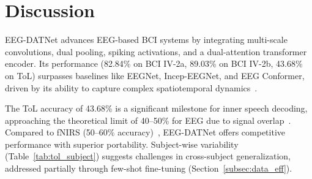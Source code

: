 \documentclass[pdflatex,sn-mathphys-num]{sn-jnl}%
\theoremstyle{thmstyleone}
\theoremstyle{thmstyletwo}
\theoremstyle{thmstylethree}
\begin{document}
\begin{table*}[htbp]
\centering
\caption{Ablation Study on BCI IV-2a}
\label{tab:ablation_test_BCI_IV_2a}
\end{table*}

\section{Discussion}

EEG-DATNet advances EEG-based BCI systems by integrating multi-scale convolutions, dual pooling, spiking activations, and a dual-attention transformer encoder. Its performance (82.84\% on BCI IV-2a, 89.03\% on BCI IV-2b, 43.68\% on ToL) surpasses baselines like EEGNet, Incep-EEGNet, and EEG Conformer, driven by its ability to capture complex spatiotemporal dynamics~\cite{lotte2018review}.

The ToL accuracy of 43.68\% is a significant milestone for inner speech decoding, approaching the theoretical limit of 40–50\% for EEG due to signal overlap~\cite{PerroneBertolotti2014}. Compared to fNIRS (50–60\% accuracy)~\cite{herff2015}, EEG-DATNet offers competitive performance with superior portability. Subject-wise variability (Table~\ref{tab:tol_subject}) suggests challenges in cross-subject generalization, addressed partially through few-shot fine-tuning (Section~\ref{subsec:data_eff}).
\end{document}
